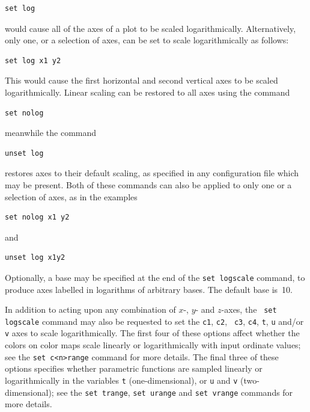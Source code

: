 \begin{verbatim}
set log
\end{verbatim}

\noindent would cause all of the axes of a plot to be scaled logarithmically.
Alternatively, only one, or a selection of axes, can be set to scale
logarithmically as follows:

\begin{verbatim}
set log x1 y2
\end{verbatim}

\noindent This would cause the first horizontal and second vertical axes to be
scaled logarithmically.  Linear scaling can be restored to all axes using the
command

\begin{verbatim}
set nolog
\end{verbatim}

\noindent meanwhile the command

\begin{verbatim}
unset log
\end{verbatim}

\noindent restores axes to their default scaling, as specified in any
configuration file which may be present. Both of these commands can also be
applied to only one or a selection of axes, as in the examples

\begin{verbatim}
set nolog x1 y2
\end{verbatim}

\noindent and

\begin{verbatim}
unset log x1y2
\end{verbatim}

Optionally, a base may be specified at the end of the {\tt set logscale}
command, to produce axes labelled in logarithms of arbitrary bases.  The
default base is~10.

In addition to acting upon any combination of $x$-, $y$- and $z$-axes, the {\tt
set logscale} command may also be requested to set the {\tt c1}, {\tt c2}, {\tt
c3}, {\tt c4}, {\tt t}, {\tt u} and/or {\tt v} axes to scale logarithmically.
The first four of these options affect whether the colors on color maps scale
linearly or logarithmically with input ordinate values; see the {\tt set
c<n>range} command for more details. The final three of these options specifies
whether parametric functions are sampled linearly or logarithmically in the
variables {\tt t} (one-dimensional), or {\tt u} and {\tt v} (two-dimensional);
see the {\tt set trange}, {\tt set urange} and {\tt set vrange} commands for
more details.


